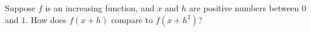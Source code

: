 \documentclass{ximera}
\begin{document}
\begin{problem}
  Suppose $f$ is an increasing function, and $x$ and $h$ are positive numbers between $0$ and $1$.  How does $f(x + h)$ compare to $f(x + h^2)$?
  \begin{multipleChoice}
  \end{multipleChoice}
\end{problem}
\end{document}
